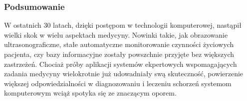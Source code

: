 
\begin{frame}
\frametitle{Podsumowanie}

W ostatnich 30 latach, dzięki postępom w technologii komputerowej, nastąpił wielki skok w wielu aspektach medycyny.
Nowinki takie, jak obrazowanie ultrasonograficzne, stałe automatyczne monitorowanie czynności życiowych pacjenta, czy bazy informacyjne zostały powszchnie przyjęte bez większych zastrzeżeń.
Chociaż próby aplikacji systemów ekpertowych wspomagających zadania medycyny wielokrotnie już udowadniały swą skuteczność, powierzenie większej odpowiedzialności w diagnozowaniu i leczeniu schorzeń systemom komputerowym wciąż spotyka się ze znaczącym oporem.
\end{frame}

